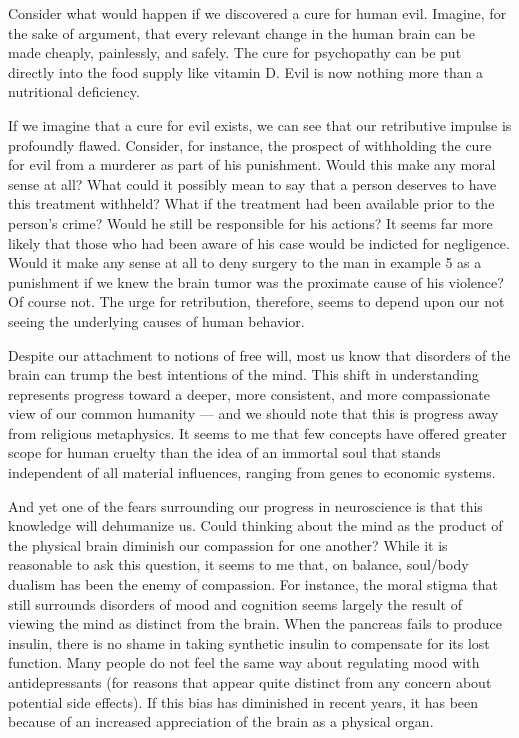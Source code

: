 \documentclass[a4paper,14pt]{extarticle}
\begin{document}
Consider what would happen if we discovered a cure for human evil.
Imagine, for the sake of argument, that every relevant change in the human brain can be made cheaply, painlessly, and safely.
The cure for psychopathy can be put directly into the food supply like vitamin D.
Evil is now nothing more than a nutritional deficiency.

If we imagine that a cure for evil exists, we can see that our retributive impulse is profoundly flawed.
Consider, for instance, the prospect of withholding the cure for evil from a murderer as part of his punishment.
Would this make any moral sense at all?
What could it possibly mean to say that a person deserves to have this treatment withheld?
What if the treatment had been available prior to the person’s crime?
Would he still be responsible for his actions?
It seems far more likely that those who had been aware of his case would be indicted for negligence.
Would it make any sense at all to deny surgery to the man in example 5 as a punishment if we knew the brain tumor was the proximate cause of his violence?
Of course not.
The urge for retribution, therefore, seems to depend upon our not seeing the underlying causes of human behavior.

Despite our attachment to notions of free will, most us know that disorders of the brain can trump the best intentions of the mind.
This shift in understanding represents progress toward a deeper, more consistent, and more compassionate view of our common humanity --- and we should note that this is progress away from religious metaphysics.
It seems to me that few concepts have offered greater scope for human cruelty than the idea of an immortal soul that stands independent of all material influences, ranging from genes to economic systems.

And yet one of the fears surrounding our progress in neuroscience is that this knowledge will dehumanize us.
Could thinking about the mind as the product of the physical brain diminish our compassion for one another?
While it is reasonable to ask this question, it seems to me that, on balance, soul/body dualism has been the enemy of compassion.
For instance, the moral stigma that still surrounds disorders of mood and cognition seems largely the result of viewing the mind as distinct from the brain.
When the pancreas fails to produce insulin, there is no shame in taking synthetic insulin to compensate for its lost function.
Many people do not feel the same way about regulating mood with antidepressants (for reasons that appear quite distinct from any concern about potential side effects).
If this bias has diminished in recent years, it has been because of an increased appreciation of the brain as a physical organ.
\end{document}

